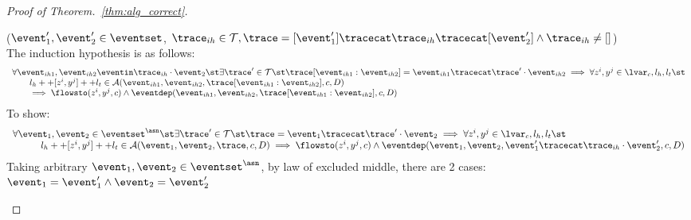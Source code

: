 \begin{proof}[Proof of Theorem.~\ref{thm:alg_correct}]
\begin{case}

%
\end{case}
%
\begin{case}
($\event_1', \event_2' \in \eventset$, $\trace_{ih} \in \mathcal{T}, \trace = [\event_1'] \tracecat \trace_{ih} \tracecat [\event_2'] \land \trace_{ih} \neq {[]}$)
\\
The induction hypothesis is as follows:
%
\[
\begin{array}{l}
  \forall \event_{ih1}, \event_{ih2} \eventin \trace_{ih} \cdot \event_2 \st
   \exists \trace' \in \mathcal{T} \st 
   \trace[\event_{ih1}:\event_{ih2}] = \event_{ih1} \tracecat \trace' \cdot \event_{ih2}
   \implies 
   \forall z^i, y^j \in \lvar_c, l_h, l_t \st 
    \\ \qquad 
   l_h ++ [z^i, y^j] ++ l_t  \in \mathcal{A}(\event_{ih1}, \event_{ih2}, \trace[\event_{ih1}:\event_{ih2}], c, D)
   \\ \qquad 
   \implies \flowsto(z^i, y^j, c) \land \eventdep(\event_{ih1}, \event_{ih2}, \trace[\event_{ih1}:\event_{ih2}], {c}, D) 
\end{array}
\]
%
To show:
\[
\begin{array}{l}
  \forall \event_1, \event_2 \in \eventset^{\asn} \st
    \exists \trace' \in \mathcal{T} \st \trace = \event_1 \tracecat \trace' \cdot \event_2
   \implies \forall  z^i, y^j \in \lvar_c, l_h, l_t \st
   \\ \quad \qquad 
   l_h ++ [z^i, y^j] ++ l_t \in \mathcal{A}(\event_1, \event_2, \trace, c, D)
   \implies \flowsto(z^i, y^j, c)  \land \eventdep(\event_1, \event_2, \event_1' \tracecat \trace_{ih} \cdot \event_2', {c}, D) 
\end{array}
\]
%
Taking arbitrary $ \event_1, \event_2 \in \eventset^{\asn}$, by law of excluded middle, there are 2 cases:
\\
$\event_1 = \event_1' \land  \event_2 = \event_2'$

\end{case}
\end{proof}
